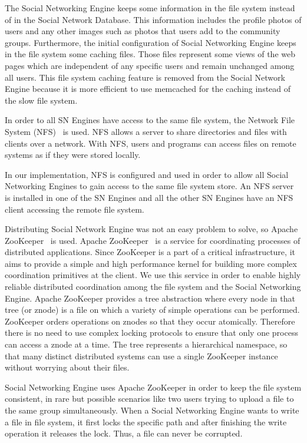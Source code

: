 The Social Networking Engine keeps some information in the file system instead of in the Social Network Database. This information includes the profile photos of users and any other images such as photos that users add to the community groups. Furthermore, the initial configuration of Social Networking Engine keeps in the file system some caching files. Those files represent some views of the web pages which are independent of any specific users and remain unchanged among all users. This file system caching feature is removed from the Social Network Engine because it is more efficient to use memcached for the caching instead of the slow file system.

In order to all SN Engines have access to the same file system, the Network File System (NFS)~\cite{sahni2015network} is used. NFS allows a server to share directories and files with clients over a network. With NFS, users and programs can access files on remote systems as if they were stored locally.

In our implementation, NFS is configured and used in order to allow all Social Networking Engines to gain access to the same file system store. An NFS server is installed in one of the SN Engines and all the other SN Engines have an NFS client accessing the remote file system.   

Distributing Social Network Engine was not an easy problem to solve, so Apache ZooKeeper~\cite{zookeeper_url} is used. 
Apache ZooKeeper~\cite{hunt2010zookeeper} is a service for coordinating processes of distributed applications. Since
ZooKeeper is a part of a critical infrastructure, it aims to provide a simple and high performance kernel
for building more complex coordination primitives at the client. 
We use this service in order to enable highly reliable distributed coordination among the file system and the Social Networking Engine. 
Apache ZooKeeper provides a tree abstraction where every node in that tree (or znode) is a file on which a variety of simple operations can be performed. ZooKeeper orders operations on znodes so that they occur atomically. Therefore there is no need to use complex locking protocols to ensure that only one process can access a znode at a time. The tree represents a hierarchical namespace, so that many distinct distributed systems can use a single ZooKeeper instance without worrying about their files. 

Social Networking Engine uses Apache ZooKeeper in order to keep the file system consistent, in rare but possible scenarios like two users trying to upload a file to the same group simultaneously. When a Social Networking Engine wants to write a file in file system, it first locks the specific path and after finishing the write operation it releases the lock. Thus, a file can never be corrupted.

